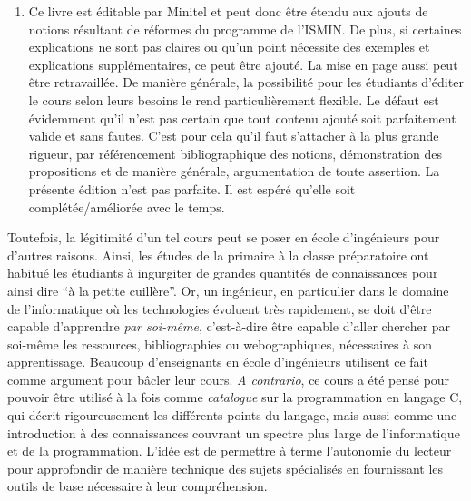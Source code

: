 \documentclass[../main.tex]{subfiles}
\begin{document}
\begin{enumerate}
	\item Ce livre est éditable par Minitel et peut donc être étendu aux ajouts de notions résultant de réformes du programme de l'ISMIN. De plus, si certaines explications ne sont pas claires ou qu'un point nécessite des exemples et explications supplémentaires, ce peut être ajouté. La mise en page aussi peut être retravaillée. De manière générale, la possibilité pour les étudiants d'éditer le cours selon leurs besoins le rend particulièrement flexible. Le défaut est évidemment qu'il n'est pas certain que tout contenu ajouté soit parfaitement valide et sans fautes. C'est pour cela qu'il faut s'attacher à la plus grande rigueur, par référencement bibliographique des notions, démonstration des propositions et de manière générale, argumentation de toute assertion. La présente édition n'est pas parfaite. Il est espéré qu'elle soit complétée/améliorée avec le temps.
\end{enumerate}
Toutefois, la légitimité d'un tel cours peut se poser en école d'ingénieurs pour d'autres raisons. Ainsi, les études de la primaire à la classe préparatoire ont habitué les étudiants à ingurgiter de grandes quantités de connaissances pour ainsi dire ``à la petite cuillère''. Or, un ingénieur, en particulier dans le domaine de l'informatique où les technologies évoluent très rapidement, se doit d'être capable d'apprendre \textit{par soi-même}, c'est-à-dire être capable d'aller chercher par soi-même les ressources, bibliographies ou webographiques, nécessaires à son apprentissage. Beaucoup d'enseignants en école d'ingénieurs utilisent ce fait comme argument pour bâcler leur cours. \textit{A contrario}, ce cours a été pensé pour pouvoir être utilisé à la fois comme \textit{catalogue} sur la programmation en langage C, qui décrit rigoureusement les différents points du langage, mais aussi comme une introduction à des connaissances couvrant un spectre plus large de l'informatique et de la programmation. L'idée est de permettre à terme l'autonomie du lecteur pour approfondir de manière technique des sujets spécialisés en fournissant les outils de base nécessaire à leur compréhension.
\end{document}
